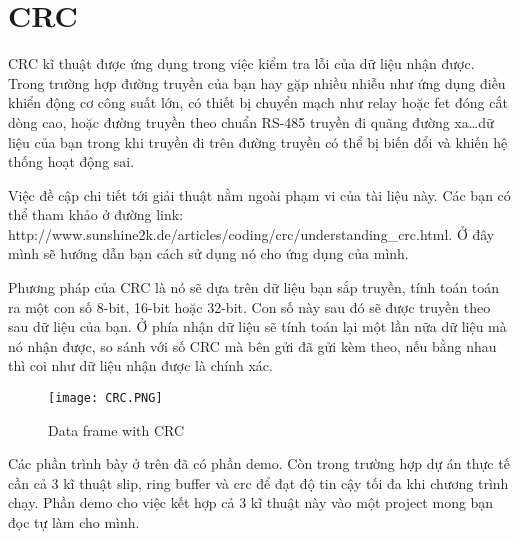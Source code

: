 \newpage
\section{CRC}

CRC kĩ thuật được ứng dụng trong việc kiểm tra lỗi của dữ liệu nhận được. Trong trường hợp đường truyền của bạn hay gặp nhiều nhiễu như ứng dụng điều khiển động cơ công suất lớn, có thiết bị chuyển mạch như relay hoặc fet đóng cắt dòng cao, hoặc đường truyền theo chuẩn RS-485 truyền đi quãng đường xa\dots dữ liệu của bạn trong khi truyền đi trên đường truyền có thể bị biến đổi và khiến hệ thống hoạt động sai.

Việc đề cập chi tiết tới giải thuật nằm ngoài phạm vi của tài liệu này. Các bạn có thể tham khảo ở đường link: http://www.sunshine2k.de/articles/coding/crc/understanding\_crc.html. Ở đây mình sẽ hướng dẫn bạn cách sử dụng nó cho ứng dụng của mình.

Phương pháp của CRC là nó sẽ dựa trên dữ liệu bạn sắp truyền, tính toán toán ra một con số 8-bit, 16-bit hoặc 32-bit. Con số này sau đó sẽ được truyền theo sau dữ liệu của bạn. Ở phía nhận dữ liệu sẽ tính toán lại một lần nữa dữ liệu mà nó nhận được, so sánh với số CRC mà bên gửi đã gửi kèm theo, nếu bằng nhau thì coi như dữ liệu nhận được là chính xác.

\begin{figure}[h!]
	\centering
    \texttt{[image: CRC.PNG]}
\caption{Data frame with CRC}
\end{figure}

Các phần trình bày ở trên đã có phần demo. Còn trong trường hợp dự án thực tế cần cả 3 kĩ thuật slip, ring buffer và crc để đạt độ tin cậy tối đa khi chương trình chạy. Phần demo cho việc kết hợp cả 3 kĩ thuật này vào một project mong bạn đọc tự làm cho mình.